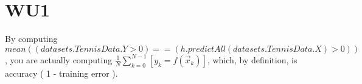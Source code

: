 \section*{WU1}
By computing $mean( ( datasets.TennisData.Y > 0 ) == ( h.predictAll( datasets.TennisData.X ) > 0 ) )$, you are actually computing $\frac{1}{N}\sum_{k = 0}^{N-1}{[y_k = f(\vec x_k)]}$, which, by definition, is accuracy ( 1 - training error ).
